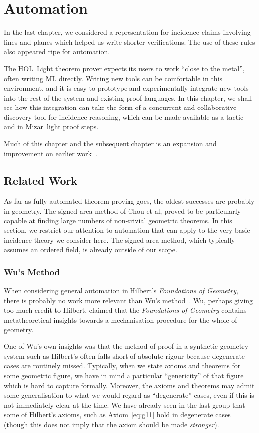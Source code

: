 \chapter{Automation}\label{chapter:Automation}
In the last chapter, we considered a representation for incidence claims involving lines and planes which helped us write shorter verifications. The use of these rules also appeared ripe for automation. 

The HOL~Light theorem prover expects its users to work ``close to the metal'', often writing ML directly. Writing new tools can be comfortable in this environment, and it is easy to prototype and experimentally integrate new tools into the rest of the system and existing proof languages. In this chapter, we shall see how this integration can take the form of a concurrent and collaborative discovery tool for incidence reasoning, which can be made available as a tactic and in Mizar~light proof steps.

Much of this chapter and the subsequent chapter is an expansion and improvement on earlier work~\cite{ScottExploring,ScottComposable}.

\section{Related Work}
As far as fully automated theorem proving goes, the oldest successes are probably in geometry. The signed-area method \cite{MachineProofsInGeometry} of Chou et al, proved to be particularly capable at finding large numbers of non-trivial geometric theorems. In this section, we restrict our attention to automation that can apply to the very basic incidence theory we consider here. The signed-area method, which typically assumes an ordered field, is already outside of our scope.

\subsection{Wu's Method}
When considering general automation in Hilbert's \emph{Foundations of Geometry}, there is probably no work more relevant than Wu's method~\cite{WuMechanicalTheoremProving}. Wu, perhaps giving too much credit to Hilbert, claimed that the \emph{Foundations of Geometry} contains metatheoretical insights towards a mechanisation procedure for the whole of geometry. 

One of Wu's own insights was that the method of proof in a synthetic geometry system such as Hilbert's often falls short of absolute rigour because degenerate cases are routinely missed. Typically, when we state axioms and theorems for some geometric figure, we have in mind a particular ``genericity'' of that figure which is hard to capture formally. Moreover, the axioms and theorems may admit some generalisation to what we would regard as ``degenerate'' cases, even if this is not immediately clear at the time. We have already seen in the last group that some of Hilbert's axioms, such as Axiom~\ref{eq:g11} hold in degenerate cases (though this does not imply that the axiom should be made \emph{stronger}). 

